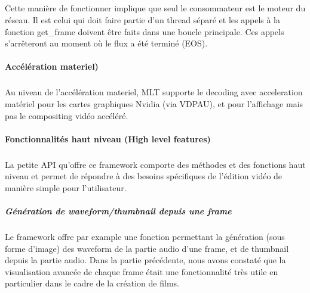 \subparagraph{}

Cette manière de fonctionner implique que seul le consommateur est
le moteur du réseau. Il est celui qui doit faire partie d'un thread
séparé et les appels à la fonction get\_frame doivent être faits
dans une boucle principale.  Ces appels s'arrêteront au moment où le
flux a été terminé (EOS).


\paragraph{Accélération materiel)}

\subparagraph{}

Au niveau de l'accélération materiel, MLT supporte le decoding
avec acceleration matériel pour les cartes graphiques Nvidia
 (via VDPAU), et pour l'affichage
mais pas le compositing vidéo accéléré.


\paragraph{Fonctionnalités haut niveau (High level features)}

\subparagraph{}

La petite API qu'offre ce framework comporte des méthodes et des
fonctions haut niveau et permet de répondre à des besoins spécifiques
de l'édition vidéo de manière simple pour l'utilisateur.

\subparagraph{Génération de waveform/thumbnail depuis une frame}

\subparagraph{}

Le framework offre par example une fonction permettant la génération
(sous forme d'image) des waveform de la partie audio d'une frame, et
de thumbnail depuis la partie audio.  Dans la partie précédente, nous
avons constaté que la visualisation avancée de chaque frame était une
fonctionnalité très utile en particulier dans le cadre de la création
de films.

